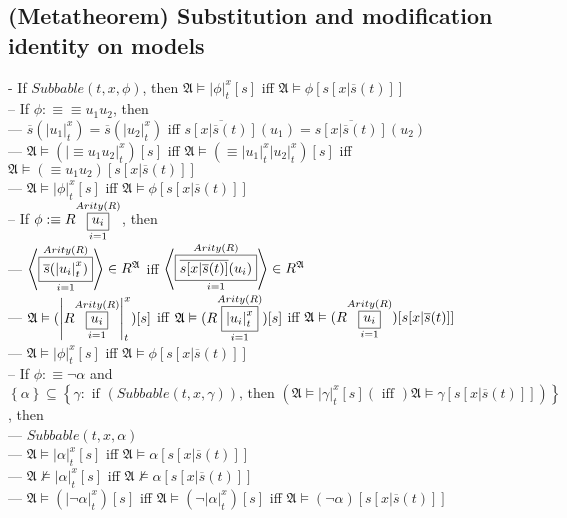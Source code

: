 \documentclass{book}
\newcommand{\is}{:\equiv}
\newcommand{\inot}{\not}
\newcommand{\txtiff}{\left(\text{ iff }\right)}
\newcommand{\txtif}[2]{\text{ if }\left(#1\right)\text{, then }\left(#2\right)}
\newcommand{\means}[2]{#1^{#2}}
\newcommand{\extend}[1]{\overline{#1}}
\newcommand{\set}[1]{\left\{ #1 \right\}}
\newcommand{\seq}[1]{\left\langle #1 \right\rangle}
\newcommand{\vdc}[3]{\underset{#2}{\overset{#3}{\fbox{$#1$}}}}
\newcommand{\sub}[3]{\left|#1\right|_{#3}^{#2}}
\begin{document}
\subsection{(Metatheorem) Substitution and modification identity on models} %
	- If $Subbable(t, x, \phi)$, then $\mathfrak{A} \vDash \sub{\phi}{x}{t}[s]$ iff $\mathfrak{A} \vDash \phi[s[x|\extend{s}(t)]]$ \\
		-- If $\phi \is \equiv u_1 u_2$, then \\
			--- $\extend{s}(\sub{u_1}{x}{t}) = \extend{s}(\sub{u_2}{x}{t})$ iff $\extend{s[x|\extend{s}(t)]}(u_1) = \extend{s[x|\extend{s}(t)]}(u_2)$ \\
			--- $\mathfrak{A} \vDash (\sub{\equiv u_1 u_2}{x}{t})[s]$ iff $\mathfrak{A} \vDash (\equiv \sub{u_1}{x}{t} \sub{u_2}{x}{t})[s]$ iff $\mathfrak{A} \vDash (\equiv u_1 u_2)[s[x|\extend{s}(t)]]$ \\
			--- $\mathfrak{A} \vDash \sub{\phi}{x}{t}[s]$ iff $\mathfrak{A} \vDash \phi[s[x|\extend{s}(t)]]$ \\
		-- If $\phi \is R \vdc{u_i}{i=1}{Arity(R)}$, then \\
			--- $\seq{\vdc{\extend{s}(\sub{u_i}{x}{t})}{i=1}{Arity(R)}} \in \means{R}{\mathfrak{A}}$ iff $\seq{\vdc{\extend{s[x|\extend{s}(t)]}(u_i)}{i=1}{Arity(R)}} \in \means{R}{\mathfrak{A}}$ \\
			--- $\mathfrak{A} \vDash (\sub{R \vdc{u_i}{i=1}{Arity(R)}}{x}{t})[s]$ iff $\mathfrak{A} \vDash (R \vdc{\sub{u_i}{x}{t}}{i=1}{Arity(R)})[s]$ iff $\mathfrak{A} \vDash (R \vdc{u_i}{i=1}{Arity(R)})[s[x|\extend{s}(t)]]$ \\
			--- $\mathfrak{A} \vDash \sub{\phi}{x}{t}[s]$ iff $\mathfrak{A} \vDash \phi[s[x|\extend{s}(t)]]$ \\
		-- If $\phi \is \lnot \alpha$ and $\set{\alpha} \subseteq \set{\gamma: \txtif{Subbable(t, x, \gamma)}{\mathfrak{A} \vDash \sub{\gamma}{x}{t}[s] \txtiff \mathfrak{A} \vDash \gamma[s[x|\extend{s}(t)]]}}$, then \\
			--- $Subbable(t, x, \alpha)$ \\
			--- $\mathfrak{A} \vDash \sub{\alpha}{x}{t}[s]$ iff $\mathfrak{A} \vDash \alpha[s[x|\extend{s}(t)]]$ \\
			--- $\mathfrak{A} \inot \vDash \sub{\alpha}{x}{t}[s]$ iff $\mathfrak{A} \inot \vDash \alpha[s[x|\extend{s}(t)]]$ \\
			--- $\mathfrak{A} \vDash (\sub{\lnot \alpha}{x}{t})[s]$ iff $\mathfrak{A} \vDash (\lnot \sub{\alpha}{x}{t})[s]$ iff $\mathfrak{A} \vDash (\lnot \alpha)[s[x|\extend{s}(t)]]$ \\
\end{document}
